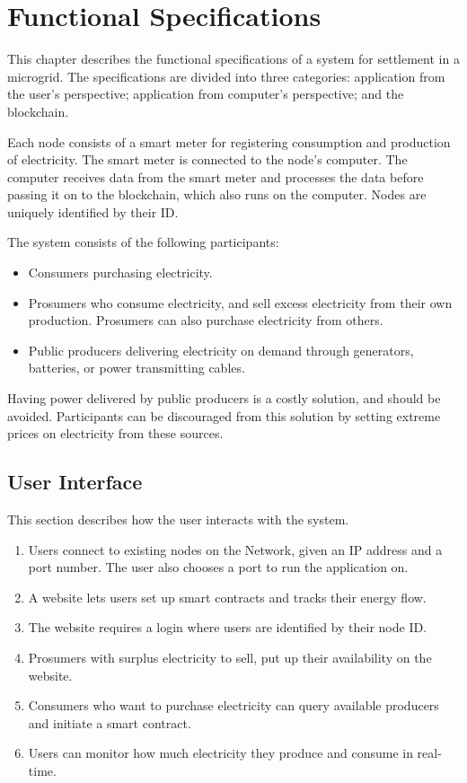 \chapter{Functional Specifications} \label{spec}
This chapter describes the functional specifications of a system for settlement in a microgrid. The specifications are divided into three categories: application from the user's perspective; application from computer's perspective; and the blockchain.

Each node consists of a smart meter%
 for registering consumption and production of electricity. The smart meter is connected to the node's computer. The computer receives data from the smart meter and processes the data before passing it on to the blockchain, which also runs on the computer. Nodes are uniquely identified by their ID.  

The system consists of the following participants:

\begin{itemize}
\item Consumers purchasing electricity.
\item Prosumers who consume electricity, and sell excess electricity from their own production. Prosumers can also purchase electricity from others.
\item Public producers delivering electricity on demand through generators, batteries, or power transmitting cables. 
\end{itemize}

Having power delivered by public producers is a costly solution, and should be avoided. Participants can be discouraged from this solution by setting extreme prices on electricity from these sources.
\section{User Interface} \label{user}
This section describes how the user interacts with the system.

\begin{enumerate}
\item Users connect to existing nodes on the Network, given an IP address and a port number. The user also chooses a port to run the application on. 
\item A website lets users set up smart contracts and tracks their energy flow. 
\item The website requires a login where users are identified by their node ID. 
\item Prosumers with surplus electricity to sell, put up their availability on the website.
\item Consumers who want to purchase electricity can query available producers and initiate a smart contract.
\item Users can monitor how much electricity they produce and consume in real-time.
\end{enumerate}

